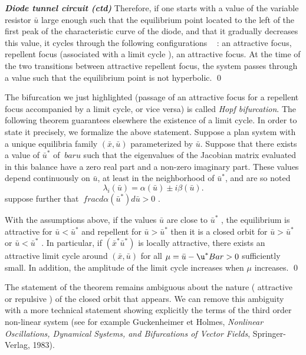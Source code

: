 \begin{exemple} {\em\bf Diode tunnel circuit (ctd)}
Therefore, if one starts with a value of the variable resistor $\bar u$ large enough such that the equilibrium point
located to the left of the first peak of the characteristic curve of the diode, and that
it gradually decreases this value, it cycles through the following configurations ~ : 
an attractive focus, repellent focus (associated with a limit cycle ), an
attractive focus. At the time of the two transitions between attractive
repellent focus, the system passes through a value such that the equilibrium point is not
hyperbolic.
\qed
\end{exemple}

The bifurcation we just highlighted (passage of an attractive focus for a repellent focus accompanied by a limit cycle, or vice versa) is
called {\em Hopf bifurcation}. The following theorem guarantees elsewhere
the existence of a limit cycle. In order to state it precisely, we formalize the above statement. 
Suppose a plan system with a unique equilibria family $(\bar x , \bar u)$ parameterized by $\bar u$. 
Suppose that there exists a value of $\bar u^*$ of $ \ bar u $ such that the eigenvalues
of the Jacobian matrix evaluated in this balance have a zero real part and a non-zero imaginary part. 
These values depend continuously on $\bar u$, at least in the neighborhood of $\bar u ^*$, 
and are so noted $$ \lambda_i ( \bar u) = \alpha ( \bar u) \pm i \beta ( \bar u).$$ 
suppose further that $\ frac{ d \alpha ( \bar u ^*) {d} \bar u} > 0$ .

\begin{theoreme}
  With the assumptions above, if the values
 $ \bar u $ are close to $ \bar u^* $ , the equilibrium is attractive
 for $ \bar u < \bar u^* $ and repellent for $ \bar u > \bar u^* $ then
 it is a closed orbit for $ \bar u > \bar u^* $ or $ \bar u < \bar u^* $ .
 In particular, if $ ( \bar x^* \bar u^*)$ is locally attractive, there exists an attractive limit cycle around
 $ (\bar x , \bar u) $ for all $ \mu = \bar u- \u^* Bar > 0$ sufficiently small.
In addition, the amplitude of the limit cycle increases when $ \mu $ increases.
\qed
\end{theoreme}
   
\begin{remarque}
The statement of the theorem remains
ambiguous about the nature ( attractive or repulsive ) of the closed orbit
that appears. We can remove this ambiguity with
a more technical statement showing explicitly
the terms of the third order non-linear system
(see for example Guckenheimer et Holmes, 
{\em Nonlinear Oscillations, Dynamical Systems, and Bifurcations of Vector 
Fields}, Springer-Verlag, 1983). 
\end{remarque}

